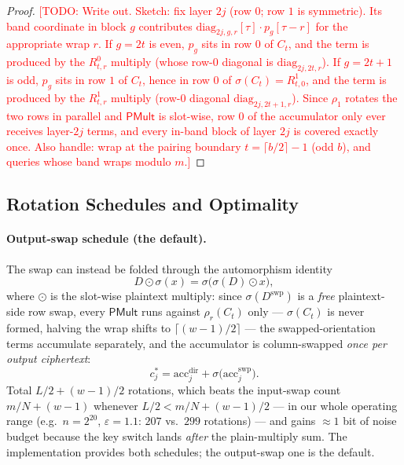 \documentclass[runningheads]{llncs}
\newcommand{\TODO}[1]{\textcolor{red}{[TODO: #1]}}
\newcommand{\PMult}{\mathsf{PMult}}          %
\newcommand{\rr}{\rho}                       %
\newcommand{\colswap}{\sigma}                %
\newcommand{\band}{w}                        %
\newcommand{\eps}{\varepsilon}               %
\begin{document}
\begin{proof}
\TODO{Write out. Sketch: fix layer $2j$ (row $0$; row $1$ is symmetric). Its band
coordinate in block $g$ contributes $\mathrm{diag}_{2j,g,r}[\tau]\cdot p_g[\tau-r]$
for the appropriate wrap $r$. If $g=2t$ is even, $p_g$ sits in row $0$ of $C_t$, and
the term is produced by the $R^0_{t,r}$ multiply (whose row-$0$ diagonal is
$\mathrm{diag}_{2j,2t,r}$). If $g=2t{+}1$ is odd, $p_g$ sits in row $1$ of $C_t$,
hence in row $0$ of $\colswap(C_t)=R^1_{t,0}$, and the term is produced by the
$R^1_{t,r}$ multiply (row-$0$ diagonal $\mathrm{diag}_{2j,2t+1,r}$). Since $\rr_1$
rotates the two rows in parallel and $\PMult$ is slot-wise, row $0$ of the
accumulator only ever receives layer-$2j$ terms, and every in-band block of layer
$2j$ is covered exactly once. Also handle: wrap at the pairing boundary
$t=\lceil b/2\rceil-1$ (odd $b$), and queries whose band wraps modulo $m$.}
\end{proof}

\subsection{Rotation Schedules and Optimality}
\label{sec:dense:schedules}

\paragraph{Output-swap schedule (the default).}
The swap can instead be folded through the automorphism identity
\begin{equation}\label{eq:swapfold}
  D\odot\colswap(x)=\colswap\big(\colswap(D)\odot x\big),
\end{equation}
where $\odot$ is the slot-wise plaintext multiply: since $\colswap(D^{\mathrm{swp}})$
is a \emph{free} plaintext-side row swap, every $\PMult$ runs against $\rr_r(C_t)$
only --- $\colswap(C_t)$ is never formed, halving the wrap shifts to
$\lceil(\band{-}1)/2\rceil$ --- the swapped-orientation terms accumulate separately,
and the accumulator is column-swapped \emph{once per output ciphertext}:
\[
  c^\ast_j=\mathrm{acc}^{\mathrm{dir}}_j+\colswap\big(\mathrm{acc}^{\mathrm{swp}}_j\big).
\]
Total $L/2+(\band{-}1)/2$ rotations, which beats the input-swap count
$m/N+(\band{-}1)$ whenever $L/2<m/N+(\band{-}1)/2$ --- in our whole operating range
(e.g.\ $n=2^{20}$, $\eps=1.1$: $207$ vs.\ $299$ rotations) --- and gains $\approx1$
bit of noise budget because the key switch lands \emph{after} the plain-multiply sum.
The implementation provides both schedules; the output-swap one is the default.
\end{document}
